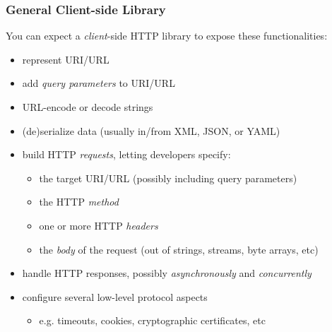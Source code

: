 \documentclass[presentation]{beamer}\mode<presentation>{\usetheme{AMSCesenaPurpleAndGold}}
\begin{document}
\begin{frame}%
\frametitle{General Client-side Library}

    You can expect a \emph{client}-side HTTP library to expose these functionalities:
    \begin{itemize}
        \item represent URI/URL

        \vfill

        \item add \emph{query parameters} to URI/URL

        \vfill

        \item URL-encode or decode strings

        \vfill

        \item (de)serialize data (usually in/from XML, \alert{JSON}, or YAML)

        \vfill

        \item build HTTP \emph{requests}, letting developers specify:
        \begin{itemize}
            \item the target URI/URL (possibly including query parameters)
            \item the HTTP \emph{method}
            \item one or more HTTP \emph{headers}
            \item the \emph{body} of the request (out of strings, streams, byte arrays, etc)
        \end{itemize}

        \vfill

        \item handle HTTP responses, possibly \emph{asynchronously} and \emph{concurrently}

        \vfill

        \item configure several low-level protocol aspects
        \begin{itemize}
            \item e.g. timeouts, cookies, cryptographic certificates, etc
        \end{itemize}
    \end{itemize}
\end{frame}
\end{document}
